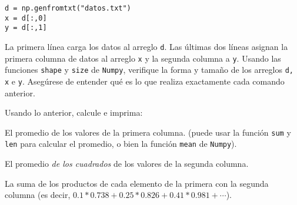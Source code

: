 \documentclass[11pt]{exam}
\begin{document}
\begin{questions}
\begin{verbatim}
d = np.genfromtxt("datos.txt")
x = d[:,0]
y = d[:,1]
\end{verbatim}

La primera línea carga los datos al arreglo \texttt{d}. Las últimas dos líneas asignan la primera columna de datos al arreglo \texttt{x} y la segunda columna a \texttt{y}. Usando las funciones \texttt{shape} y \texttt{size} de \texttt{Numpy}, verifique la forma y tamaño de los arreglos \texttt{d, x} e \texttt{y}. Asegúrese de entender qué es lo que realiza exactamente cada comando anterior.


\item Usando lo anterior, calcule e imprima:
\begin{parts}
\item El promedio de los valores de la primera columna. (puede usar la función \texttt{sum} y \texttt{len} para calcular el promedio, o bien la función \texttt{mean} de \texttt{Numpy}).
\item El promedio \textit{de los cuadrados} de los valores de la segunda columna.
\item La suma de los productos de cada elemento de la primera con la segunda columna (es decir, $0.1*0.738 + 0.25 *	0.826 + 0.41 * 0.981 +\cdots$).
\end{parts}
\end{questions}
\end{document}
